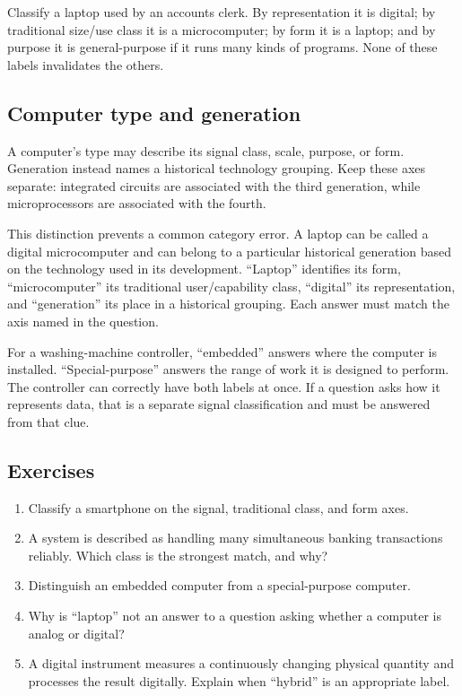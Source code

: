 \begin{example}
Classify a laptop used by an accounts clerk. By representation it is digital;
by traditional size/use class it is a microcomputer; by form it is a laptop;
and by purpose it is general-purpose if it runs many kinds of programs.
None of these labels invalidates the others.
\end{example}

\subsection*{Computer type and generation}
A computer's type may describe its signal class, scale, purpose, or form.
Generation instead names a historical technology grouping. Keep these axes
separate: integrated circuits are associated with the third generation,
while microprocessors are associated with the fourth.

This distinction prevents a common category error. A laptop can be called a
digital microcomputer and can belong to a particular historical generation
based on the technology used in its development. ``Laptop'' identifies its
form, ``microcomputer'' its traditional user/capability class, ``digital''
its representation, and ``generation'' its place in a historical grouping.
Each answer must match the axis named in the question.

\begin{example}
For a washing-machine controller, ``embedded'' answers where the computer is
installed. ``Special-purpose'' answers the range of work it is designed to
perform. The controller can correctly have both labels at once. If a
question asks how it represents data, that is a separate signal
classification and must be answered from that clue.
\end{example}

\subsection*{Exercises}
\begin{enumerate}[label=\arabic*.]
  \item Classify a smartphone on the signal, traditional class, and form
    axes.
  \item A system is described as handling many simultaneous banking
    transactions reliably. Which class is the strongest match, and why?
  \item Distinguish an embedded computer from a special-purpose computer.
  \item Why is ``laptop'' not an answer to a question asking whether a
    computer is analog or digital?
  \item A digital instrument measures a continuously changing physical
    quantity and processes the result digitally. Explain when ``hybrid'' is
    an appropriate label.
\end{enumerate}

